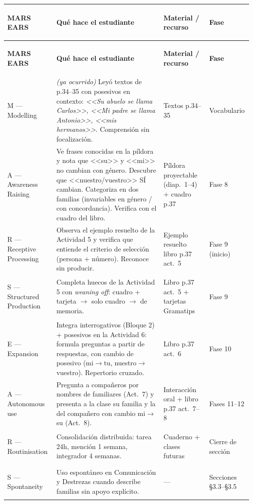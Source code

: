 \documentclass[a4paper,10pt]{article}
\renewcommand{\arraystretch}{1.3}
\begin{document}
{\small
\renewcommand{\arraystretch}{1.45}
\begin{longtable}{|>{\bfseries\raggedright\arraybackslash}p{1.8cm}|p{4.5cm}|p{3.8cm}|p{2.8cm}|}
\hline
\rowcolor{purpura!15}
\textbf{MARS EARS} & \textbf{Qu\'e hace el estudiante} & \textbf{Material / recurso} & \textbf{Fase} \\
\hline
\endfirsthead
\hline
\rowcolor{purpura!15}
\textbf{MARS EARS} & \textbf{Qu\'e hace el estudiante} & \textbf{Material / recurso} & \textbf{Fase} \\
\hline
\endhead

M --- Modelling & \textit{(ya ocurrido)} Ley\'o textos de p.34--35 con posesivos en contexto: \textit{<<Su abuelo se llama Carlos>>, <<Mi padre se llama Antonio>>, <<mis hermanos>>}. Comprensi\'on sin focalizaci\'on. & Textos p.34--35 & Vocabulario \\
\hline

A --- Awareness Raising & Ve frases conocidas en la p\'ildora y nota que <<su>> y <<mi>> no cambian con g\'enero. Descubre que <<nuestro/vuestro>> S\'I cambian. Categoriza en dos familias (invariables en g\'enero / con concordancia). Verifica con el cuadro del libro. & P\'ildora proyectable (diap.~1--4) + cuadro p.37 & Fase 8 \\
\hline

R --- Receptive Processing & Observa el ejemplo resuelto de la Actividad 5 y verifica que entiende el criterio de selecci\'on (persona + n\'umero). Reconoce sin producir. & Ejemplo resuelto libro p.37 act.~5 & Fase 9 (inicio) \\
\hline

S --- Structured Production & Completa huecos de la Actividad 5 con \textit{weaning off}: cuadro + tarjeta $\rightarrow$ solo cuadro $\rightarrow$ de memoria. & Libro p.37 act.~5 + tarjetas Gramatips & Fase 9 \\
\hline

E --- Expansion & Integra interrogativos (Bloque 2) + posesivos en la Actividad 6: formula preguntas a partir de respuestas, con cambio de posesivo (mi$\rightarrow$tu, nuestro$\rightarrow$vuestro). Repertorio cruzado. & Libro p.37 act.~6 & Fase 10 \\
\hline

A --- Autonomous use & Pregunta a compa\~{n}eros por nombres de familiares (Act.~7) y presenta a la clase su familia y la del compa\~{n}ero con cambio mi$\rightarrow$su (Act.~8). & Interacci\'on oral + libro p.37 act.~7--8 & Fases 11--12 \\
\hline

R --- Routinisation & Consolidaci\'on distribuida: tarea 24h, menci\'on 1 semana, integrador 4 semanas. & Cuaderno + clases futuras & Cierre de secci\'on \\
\hline

S --- Spontaneity & Uso espont\'aneo en Comunicaci\'on y Destrezas cuando describe familias sin apoyo expl\'icito. & --- & Secciones \S3.3--\S3.5 \\
\hline

\end{longtable}
}
\end{document}
